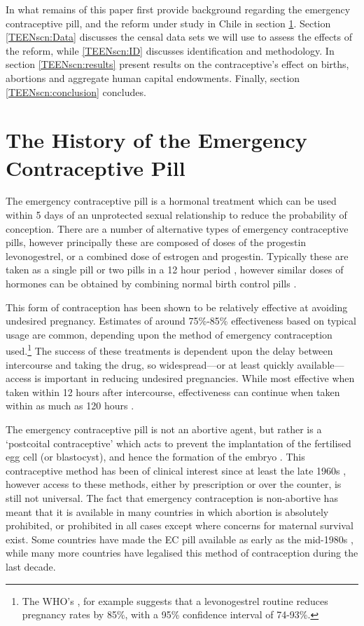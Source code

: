 In what remains of this paper \person first provide background regarding the
emergency contraceptive pill, and the reform under study in Chile in section
\ref{TEENscn:background}.  Section \ref{TEENscn:Data} discusses the censal data 
sets we will use to assess the effects of the reform, while \ref{TEENscn:ID} 
discusses identification and methodology.  In section \ref{TEENscn:results} 
\person present results on the contraceptive's effect on births, abortions and 
aggregate human capital endowments.  Finally, section \ref{TEENscn:conclusion} 
concludes.
  
\section{The History of the Emergency Contraceptive Pill}
\label{TEENscn:background}
The emergency contraceptive pill is a hormonal treatment which can be used 
within 5 days of an unprotected sexual relationship to reduce the probability
of conception.  There are a number of alternative types of emergency 
contraceptive pills, however principally these are composed of doses of the 
progestin levonogestrel, or a combined dose of estrogen and progestin. 
Typically these are taken as a single pill or two pills in a 12 hour period
\citep{vonHertzenetal2002}, however similar doses of hormones can be obtained 
by combining normal birth control pills \citep{Ellersonetal1998}.  

This form of contraception has been shown to be relatively effective at 
avoiding undesired pregnancy.  Estimates of around 75\%-85\% effectiveness 
based on typical usage are common, depending upon the method of emergency 
contraception used.\footnote{The WHO's \citet{WHO1998}, for example suggests 
that a levonogestrel routine reduces pregnancy rates by 85\%, with a 95\% 
confidence interval of 74-93\%.}  The success of these treatments is dependent
upon the delay between intercourse and taking the drug, so widespread---or at 
least quickly available---access is important in reducing undesired 
pregnancies.  While most effective when taken within 12 hours after 
intercourse, effectiveness can continue when taken within as much as 120 hours
\citep{vonHertzenetal2002}.

The emergency contraceptive pill is not an abortive agent, but rather is a 
`postcoital contraceptive' which acts to prevent the implantation of the 
fertilised egg cell (or blastocyst), and hence the formation of the embryo 
\citep{Morris1973}.  This contraceptive method has been of clinical interest
since at least the late 1960s \citep{Demers1971}, however access to these 
methods, either by prescription or over the counter, is still not universal.
The fact that emergency contraception is non-abortive has meant that it is
available in many countries in which abortion is absolutely prohibited, or
prohibited in all cases except where concerns for maternal survival exist.
Some countries have made the EC pill available as early as the mid-1980s 
\citep{UKFPA2006}, while many more countries have legalised this method of 
contraception during the last decade.


